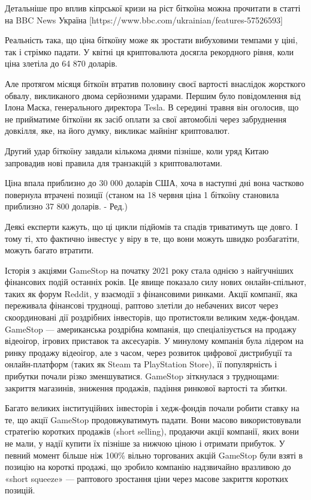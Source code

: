 \documentclass[12pt]{report}
\begin{document}
Детальніше про вплив кіпрської кризи на ріст біткоїна можна прочитати в статті на BBC News Україна
[https://www.bbc.com/ukrainian/features-57526593]

Реальність така, що ціна біткоїну може як зростати вибуховими темпами у ціні, так і стрімко падати. У квітні ця криптовалюта досягла рекордного рівня, коли ціна злетіла до 64 870 доларів.

Але протягом місяця біткоїн втратив половину своєї вартості внаслідок жорсткого обвалу, викликаного двома серйозними ударами.
Першим було повідомлення від Ілона Маска, генерального директора Tesla. В середині травня він оголосив, що не прийматиме біткоїни як засіб оплати за свої автомобілі через забруднення довкілля, яке, на його думку, викликає майнінг криптовалют.

Другий удар біткоїну завдали кількома днями пізніше, коли уряд Китаю запровадив нові правила для транзакцій з криптовалютами.

Ціна впала приблизно до 30 000 доларів США, хоча в наступні дні вона частково повернула втрачені позиції (станом на 18 червня ціна 1 біткоїну становила приблизно 37 800 доларів. - Ред.)

Деякі експерти кажуть, що ці цикли підйомів та спадів триватимуть ще довго. І тому ті, хто фактично інвестує у віру в те, що вони можуть швидко розбагатіти, можуть багато втратити.




Історія з акціями GameStop на початку 2021 року стала однією з найгучніших фінансових подій останніх років. Це явище показало силу нових онлайн-спільнот, таких як форум Reddit, у взаємодії з фінансовими ринками. Акції компанії, яка переживала фінансові труднощі, раптово злетіли до небачених висот через скоординовані дії роздрібних інвесторів, що протистояли великим хедж-фондам. 
GameStop — американська роздрібна компанія, що спеціалізується на продажу відеоігор, ігрових приставок та аксесуарів. У минулому компанія була лідером на ринку продажу відеоігор, але з часом, через розвиток цифрової дистрибуції та онлайн-платформ (таких як Steam та PlayStation Store), її популярність і прибутки почали різко зменшуватися. GameStop зіткнулася з труднощами: закриття магазинів, зниження продажів, падіння ринкової вартості та збитки.

Багато великих інституційних інвесторів і хедж-фондів почали робити ставку на те, що акції GameStop продовжуватимуть падати. Вони масово використовували стратегію коротких продажів (short selling), продаючи акції компанії, яких вони не мали, у надії купити їх пізніше за нижчою ціною і отримати прибуток. У певний момент більше ніж 100\% вільно торгованих акцій GameStop були взяті в позицію на короткі продажі, що зробило компанію надзвичайно вразливою до «short squeeze» — раптового зростання ціни через масове закриття коротких позицій.
\end{document}
